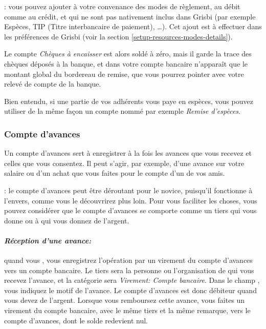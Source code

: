 \Note{}: vous pouvez ajouter à votre convenance des modes de règlement, au débit comme au crédit, et qui ne sont pas nativement inclus dans Grisbi (par exemple Espèces, TIP (Titre interbancaire de paiement), \ldots). Cet ajout est à effectuer dans les préférences de Grisbi (voir la section \vref{setup-resources-modes-details}).

Le compte \emph{Chèques à encaisser} est alors soldé à zéro, mais il garde la trace des chèques déposés à la banque, et dans votre compte bancaire n'apparaît que le montant global du bordereau de remise, que vous pourrez pointer avec votre relevé de compte de la banque.

Bien entendu, si une partie de vos adhérents vous paye en espèces, vous pouvez utiliser de la même façon un compte nommé par exemple \emph{Remise d'espèces}.


\subsubsection{Compte d'avances\label{accounts-type-bank-advance}}

Un compte d'avances sert à enregistrer à la fois les avances que vous recevez et celles que vous consentez. Il peut s'agir, par exemple, d'une avance sur votre salaire ou d'un achat que vous faites pour le compte d'un de vos amis.

\Note{}: le compte d'avances peut être déroutant pour le novice, puisqu'il fonctionne à l'envers, comme vous le découvrirez plus loin. Pour vous faciliter les choses, vous pouvez considérer que le compte d'avances se comporte comme un tiers qui vous donne ou à qui vous donnez de l'argent.

\paragraph{\textsl{Réception d'une avance:}} quand vous , vous enregistrez l'opération par un virement du compte d'avances vers un compte bancaire. Le tiers sera la personne ou l'organisation de qui vous recevez l'avance, et la catégorie sera \emph{Virement: Compte bancaire}. Dans le champ , vous indiquez le motif de l'avance. Le compte d'avances est donc débiteur quand vous devez de l'argent. Lorsque vous remboursez cette avance, vous faites un virement du compte bancaire, avec le même tiers et la même remarque, vers le compte d'avances, dont le solde redevient nul.

